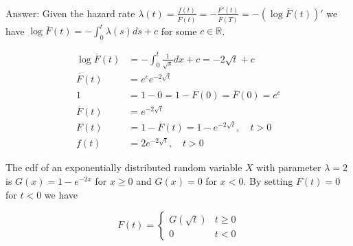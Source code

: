 \documentclass{article}
\begin{document}
\begin{enumerate}
Answer: Given the hazard rate $\lambda(t) = \frac{f(t)}{\overline{F}(t)} = -\frac{\overline{F}'(t)}{\overline{F}(T)} = -(\log \overline{F}(t))'$ we have
$\log \overline{F}(t) = -\int_0^t \lambda(s) ds + c$ for some $c \in \mathbb{R}$.

\begin{align*}
\log \overline{F}(t) &= -\int_0^t \frac{1}{\sqrt{s}} dx + c= -2\sqrt{t} + c \\
\overline{F}(t) &= e^c e^{-2\sqrt{t}} \\
1 &= 1-0 = 1-F(0) = \overline{F}(0) = e^c \\
\overline{F}(t) &= e^{-2\sqrt{t}} \\
F(t) &= 1- \overline{F}(t) = 1-e^{-2\sqrt{t}}, \quad t > 0 \\
f(t) &= 2e^{-2\sqrt{t}}, \quad t > 0
\end{align*}

The cdf of an exponentially distributed random variable $X$ with parameter $\lambda = 2$ is $G(x) = 1 - e^{-2 x}$ for $x \geq 0$ and $G(x) = 0$ for $x < 0$. By setting $F(t) = 0$ for $t < 0$ we have

$$
F(t) = \begin{cases}
G(\sqrt{t}) & t \geq 0 \\
0 & t < 0
\end{cases}
$$



\end{enumerate}
\end{document}
